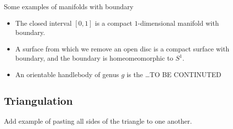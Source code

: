 \documentclass[11pt,a4paper]{article}
\begin{document}
Some examples of manifolds with boundary
\begin{itemize}
  \item The closed interval $[0,1]$ is a compact $1$-dimensional manifold
    with boundary.
  \item A surface from which we remove an open disc is a compact surface
    with boundary, and the boundary is homeomeomorphic to $S^1$.
  \item An orientable handlebody of genus $g$ is the \dots TO BE CONTINUTED
\end{itemize}

\subsection{Triangulation}



Add example of pasting all sides of the triangle to one another.
\end{document}
